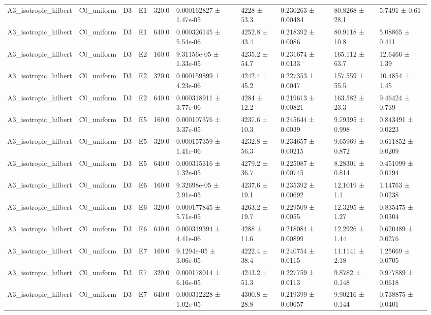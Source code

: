 \begin{table}
\begin{tabular}{llllllllll}
A3\_isotropic\_hilbert & C0\_uniform & D3 & E1 & 320.0 & 0.000162827 ± 1.47e-05 & 4228 ± 53.3 & 0.230263 ± 0.00484 & 80.8268 ± 28.1 & 5.7491 ± 0.61 \\
A3\_isotropic\_hilbert & C0\_uniform & D3 & E1 & 640.0 & 0.000326145 ± 5.54e-06 & 4252.8 ± 43.4 & 0.218392 ± 0.0086 & 80.9118 ± 10.8 & 5.08865 ± 0.411 \\
A3\_isotropic\_hilbert & C0\_uniform & D3 & E2 & 160.0 & 9.31156e-05 ± 1.33e-05 & 4235.2 ± 54.7 & 0.231674 ± 0.0133 & 165.112 ± 63.7 & 12.6466 ± 1.39 \\
A3\_isotropic\_hilbert & C0\_uniform & D3 & E2 & 320.0 & 0.000159899 ± 4.23e-06 & 4242.4 ± 45.2 & 0.227353 ± 0.0047 & 157.559 ± 55.5 & 10.4854 ± 1.45 \\
A3\_isotropic\_hilbert & C0\_uniform & D3 & E2 & 640.0 & 0.000318911 ± 3.77e-06 & 4284 ± 12.2 & 0.219613 ± 0.00821 & 163.582 ± 23.3 & 9.46424 ± 0.739 \\
A3\_isotropic\_hilbert & C0\_uniform & D3 & E5 & 160.0 & 0.000107376 ± 3.37e-05 & 4237.6 ± 10.3 & 0.245644 ± 0.0039 & 9.79395 ± 0.998 & 0.843491 ± 0.0223 \\
A3\_isotropic\_hilbert & C0\_uniform & D3 & E5 & 320.0 & 0.000157359 ± 1.41e-06 & 4232.8 ± 56.3 & 0.234657 ± 0.00215 & 9.65969 ± 0.872 & 0.611852 ± 0.0209 \\
A3\_isotropic\_hilbert & C0\_uniform & D3 & E5 & 640.0 & 0.000315316 ± 1.32e-05 & 4279.2 ± 36.7 & 0.225087 ± 0.00745 & 8.28301 ± 0.814 & 0.451099 ± 0.0194 \\
A3\_isotropic\_hilbert & C0\_uniform & D3 & E6 & 160.0 & 9.32698e-05 ± 2.91e-05 & 4237.6 ± 19.1 & 0.235392 ± 0.00692 & 12.1019 ± 1.1 & 1.14763 ± 0.0238 \\
A3\_isotropic\_hilbert & C0\_uniform & D3 & E6 & 320.0 & 0.000177845 ± 5.71e-05 & 4263.2 ± 19.7 & 0.229509 ± 0.0055 & 12.3295 ± 1.27 & 0.835475 ± 0.0304 \\
A3\_isotropic\_hilbert & C0\_uniform & D3 & E6 & 640.0 & 0.000319394 ± 4.41e-06 & 4288 ± 11.6 & 0.218084 ± 0.00899 & 12.2926 ± 1.44 & 0.620489 ± 0.0276 \\
A3\_isotropic\_hilbert & C0\_uniform & D3 & E7 & 160.0 & 9.1294e-05 ± 3.06e-05 & 4222.4 ± 38.4 & 0.240754 ± 0.0115 & 11.1141 ± 2.18 & 1.25669 ± 0.0705 \\
A3\_isotropic\_hilbert & C0\_uniform & D3 & E7 & 320.0 & 0.000178014 ± 6.16e-05 & 4243.2 ± 51.3 & 0.227759 ± 0.0113 & 9.8782 ± 0.148 & 0.977889 ± 0.0618 \\
A3\_isotropic\_hilbert & C0\_uniform & D3 & E7 & 640.0 & 0.000312228 ± 1.02e-05 & 4300.8 ± 28.8 & 0.219399 ± 0.00657 & 9.90216 ± 0.144 & 0.738875 ± 0.0401 \\

\end{tabular}
\end{table}
